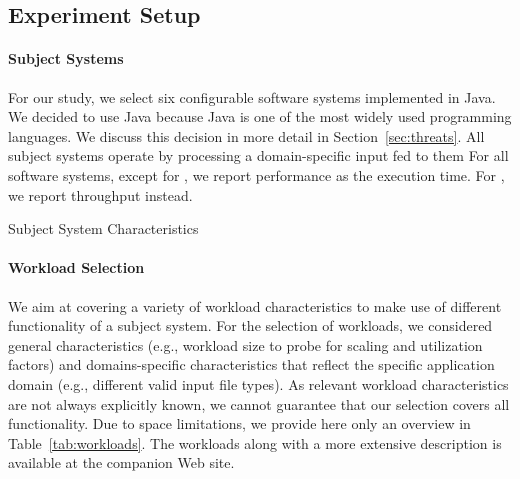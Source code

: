 
\subsection{Experiment Setup}\label{sec:setup}
\paragraph{Subject Systems}
For our study, we select six configurable software systems implemented in Java. We decided to use Java because Java is one of the most widely used programming languages. We discuss this decision in more detail in Section~\ref{sec:threats}. 
All subject systems operate by processing a domain-specific input fed to them
For all software systems, except for \htwo, we report performance as the execution time. For \htwo, we report throughput instead. 

\begin{table}[h]
	\footnotesize
	\centering
	\caption{Subject System Characteristics}
	
	\label{tab:subject_systems}
\end{table}

\paragraph{Workload Selection}
We aim at covering a variety of workload characteristics to make use of different functionality of a subject system. For the selection of workloads, we considered general characteristics (e.g., workload size to probe for scaling and utilization factors) and domains-specific characteristics that reflect the specific application domain (e.g., different valid input file types). As relevant workload characteristics are not always explicitly known, we cannot guarantee that our selection covers all functionality.
Due to space limitations, we provide here only an overview in Table~\ref{tab:workloads}. The workloads along with a more extensive description is available at the companion Web site. 


